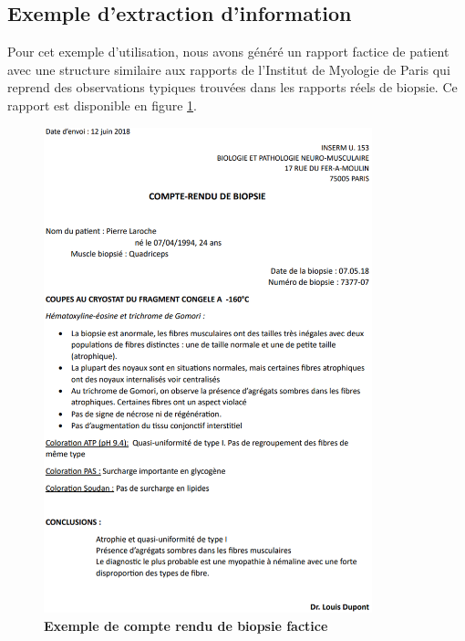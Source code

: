 \subsection{Exemple d'extraction d'information}
Pour cet exemple d'utilisation, nous avons généré un rapport factice de patient avec une structure similaire aux rapports de l'Institut de Myologie de Paris qui reprend des observations typiques trouvées dans les rapports réels de biopsie. Ce rapport est disponible en figure \ref{fig:factice_report}. 
\begin{figure}[!ht]
 \centering
 \includegraphics[width=0.85\textwidth]{figures/pdf_biopsie.png}
 \caption[Compte rendus de biopsie factice]{\textbf{Exemple de compte rendu de biopsie factice}}
 \label{fig:factice_report}
\end{figure}

